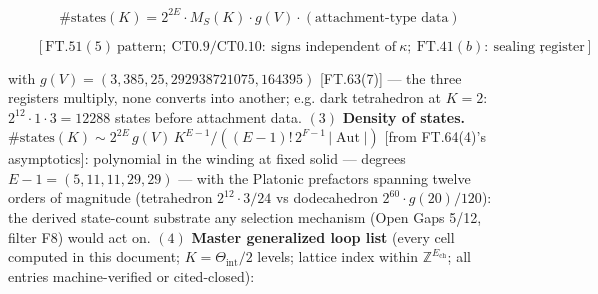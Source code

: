 \begin{theorem}
\[
\#\text{states}(K)=2^{2E}\cdot M_S(K)\cdot g(V)\cdot(\text{attachment-type data})
\]

\[
\qquad [\mathrm{FT.51}(5)\ \text{pattern};\ \mathrm{CT0.9}/\mathrm{CT0.10}:\ \text{signs independent of}\ \kappa;\ \mathrm{FT.41}(b):\ \text{sealing register}],
\]

with $g(V)=(3,385,25,292938721075,164395)$ [FT.63(7)] — the three registers multiply, none converts into another; e.g. dark tetrahedron at $K{=}2$: $2^{12}\cdot1\cdot3=12288$ states before attachment data. $(3)$ \textbf{Density of states.} $\#\text{states}(K)\sim2^{2E}\,g(V)\,K^{E-1}/((E-1)!\,2^{F-1}\,|\operatorname{Aut}|)$ [from FT.64(4)'s asymptotics]: polynomial in the winding at fixed solid — degrees $E-1=(5,11,11,29,29)$ — with the Platonic prefactors spanning twelve orders of magnitude (tetrahedron $2^{12}\cdot3/24$ vs dodecahedron $2^{60}\cdot g(20)/120$): the derived state-count substrate any selection mechanism (Open Gaps 5/12, filter F8) would act on. $(4)$ \textbf{Master generalized loop list} (every cell computed in this document; $K=\Theta_{\mathrm{int}}/2$ levels; lattice index within $\mathbb Z^{E_{\mathrm{ch}}}$; all entries machine-verified or cited-closed):


\end{theorem}
